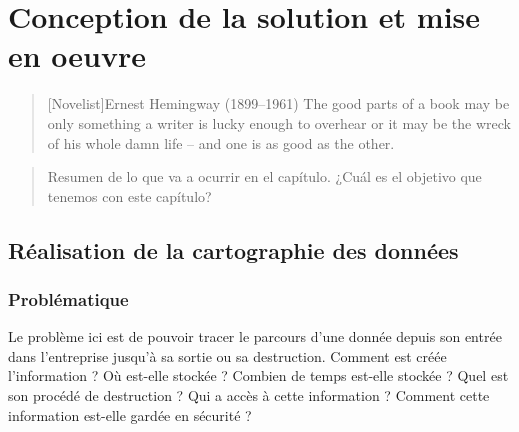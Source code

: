 \chapter{Conception de la solution et mise en oeuvre}

\begin{quotation}[Novelist]{Ernest Hemingway (1899--1961)}
The good parts of a book may be only something a writer is lucky enough to overhear or it may be the wreck of his whole damn life -- and one is as good as the other.
\end{quotation}

\begin{abstract}
Resumen de lo que va a ocurrir en el capítulo. ¿Cuál es el objetivo que tenemos con este capítulo?
\end{abstract}

\section{Réalisation de la cartographie des données}
\subsection{Problématique}
Le problème ici est de pouvoir tracer le parcours d’une donnée depuis son entrée dans l’entreprise jusqu’à sa sortie ou sa destruction. Comment est créée l’information ? Où est-elle stockée ? Combien de temps est-elle stockée ? Quel est son procédé de destruction ? Qui a accès à cette information ? Comment cette information est-elle gardée en sécurité ?

